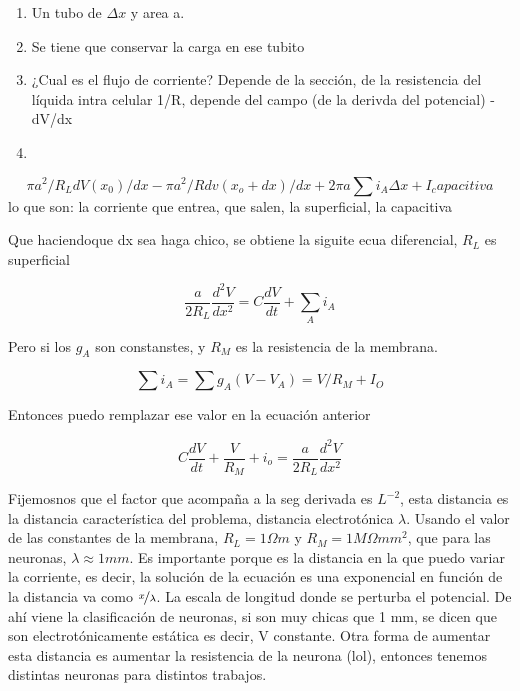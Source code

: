 \begin{enumerate}
	\item Un tubo de $\Delta x$ y area a.
	\item Se tiene que conservar la carga en ese tubito
	\item ¿Cual es el flujo de corriente? Depende de la sección, de la resistencia del líquida intra celular 1/R, depende del campo (de la derivda del potencial) -dV/dx
	\item 
\end{enumerate}

\begin{equation}
	\pi a^2/R_L dV(x_0)/dx - \pi a^2/R dv(x_o+dx)/dx +  2\pi a \sum i_A\Delta x + I_capacitiva
\end{equation}
lo que son: la corriente que entrea, que salen, la superficial, la capacitiva

Que haciendoque dx sea haga chico, se obtiene la siguite ecua diferencial, $R_L$ es superficial

\begin{equation}
	\frac{a}{2R_L}\frac{d^2V}{dx^2} = C \frac{dV}{dt} + \sum_A i_A
 \end{equation}

Pero si los $g_A$ son constanstes, y $R_M$ es la resistencia de la membrana.

\begin{equation}
	\sum i_A = \sum g_A(V-V_A) = V/R_M + I_O
\end{equation}

Entonces puedo remplazar ese valor en la ecuación anterior

\begin{equation}
	C \frac{dV}{dt} + \frac{V}{R_M} + i_o = \frac{a}{2R_L}\frac{d^2V}{dx^2}
\end{equation}


Fijemosnos que el factor que acompaña a la seg derivada es  $L^{-2}$, esta distancia es la distancia característica del problema, distancia electrotónica $\lambda$. Usando el valor de las constantes de la membrana, $R_L = 1 \Omega m$ y $R_M = 1 M\Omega mm^2$, que para las neuronas, $\lambda \approx 1 mm$. Es importante porque es la distancia en la que puedo variar la corriente, es decir, la solución de la ecuación es una exponencial en función de la distancia va como $\nicefrac{x}{\lambda}$. La escala de longitud donde se perturba el potencial. De ahí viene la clasificación de neuronas, si son muy chicas que 1 mm, se dicen que son electrotónicamente estática es decir, V constante.  Otra forma de aumentar esta distancia es aumentar la resistencia de la neurona (lol), entonces tenemos distintas neuronas para distintos trabajos.

